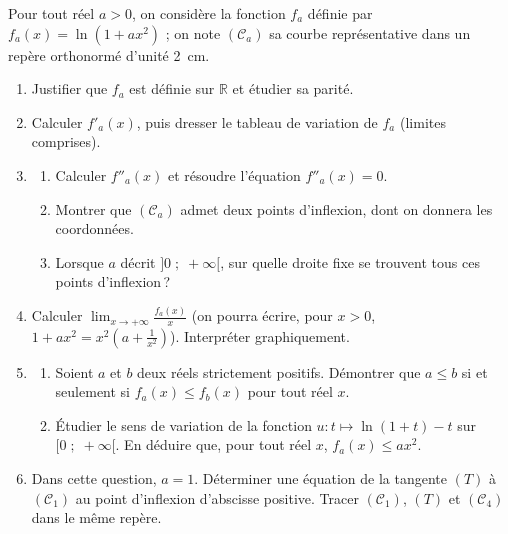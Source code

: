\begin{exo}
\label{exo:el famille ln}
Pour tout r\'eel $a > 0$, on consid\`ere la fonction $f_a$ d\'efinie par $f_a(x) = \ln\left(1 + a x^2\right)$ ;
on note $(\mathscr{C}_a)$ sa courbe repr\'esentative dans un rep\`ere orthonorm\'e \Oij d'unit\'e 2~cm.
\begin{enumerate}
\item Justifier que $f_a$ est d\'efinie sur $\mathbb{R}$ et \'etudier sa parit\'e.
\item Calculer $f'_a(x)$, puis dresser le tableau de variation de $f_a$ (limites comprises).
\item \begin{enumerate}
      \item Calculer $f''_a(x)$ et r\'esoudre l'\'equation $f''_a(x) = 0$.
      \item Montrer que $(\mathscr{C}_a)$ admet deux points d'inflexion, dont on donnera les coordonn\'ees.
      \item Lorsque $a$ d\'ecrit $]0 \; ; \; +\infty[$, sur quelle droite fixe se trouvent tous ces points d'inflexion\,?
      \end{enumerate}
\item Calculer $\lim_{x \rightarrow +\infty} \frac{f_a(x)}{x}$ (on pourra \'ecrire, pour $x > 0$,
      $1 + a x^2 = x^2 \left( a + \frac{1}{x^2} \right)$). Interpr\'eter graphiquement.
\item \begin{enumerate}
      \item Soient $a$ et $b$ deux r\'eels strictement positifs. D\'emontrer que
            $a \leq b$ si et seulement si $f_a(x) \leq f_b(x)$ pour tout r\'eel $x$.
      \item \'Etudier le sens de variation de la fonction $u : t \mapsto \ln(1+t) - t$ sur $[0 \; ; \; +\infty[$.
            En d\'eduire que, pour tout r\'eel $x$, $f_a(x) \leq a x^2$.
      \end{enumerate}
\item Dans cette question, $a = 1$. D\'eterminer une \'equation de la tangente $(T)$ \`a $(\mathscr{C}_1)$
      au point d'inflexion d'abscisse positive.
      Tracer $(\mathscr{C}_1)$, $(T)$ et $(\mathscr{C}_4)$ dans le m\^eme rep\`ere.
\end{enumerate}
\end{exo}
